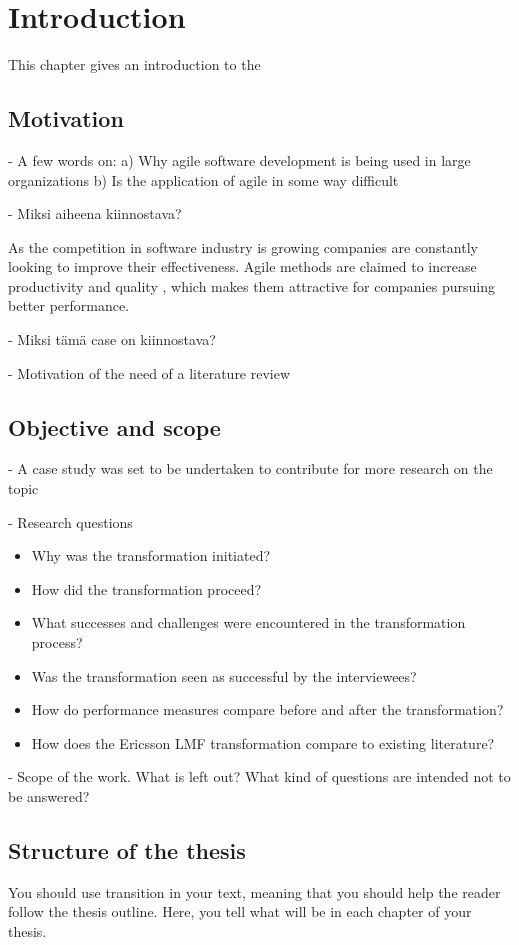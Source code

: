 
\chapter{Introduction}
\label{chapter:intro}

This chapter gives an introduction to the

\section{Motivation}

- A few words on:
a) Why agile software development is being used in large organizations
b) Is the application of agile in some way difficult

- Miksi aiheena kiinnostava?

As the competition in software industry is growing companies are constantly
looking to improve their effectiveness. Agile methods are claimed to increase
productivity and quality \cite{Livermore2008}, which makes them attractive
for companies pursuing better performance.

- Miksi tämä case on kiinnostava?

- Motivation of the need of a literature review


\section{Objective and scope}

- A case study was set to be undertaken to contribute for more research on the topic

- Research questions

\begin{itemize}
  \item Why was the transformation initiated?
  \item How did the transformation proceed?
  \item What successes and challenges were encountered in the transformation
        process?
  \item Was the transformation seen as successful by the interviewees?
  \item How do performance measures compare before and after the transformation?
  \item How does the Ericsson LMF transformation compare to existing literature?
\end{itemize}

- Scope of the work.
What is left out?
What kind of questions are intended not to be answered?


\section{Structure of the thesis}

You should use transition in your text, meaning that you should help
the reader follow the thesis outline. Here, you tell what will be in
each chapter of your thesis. 

